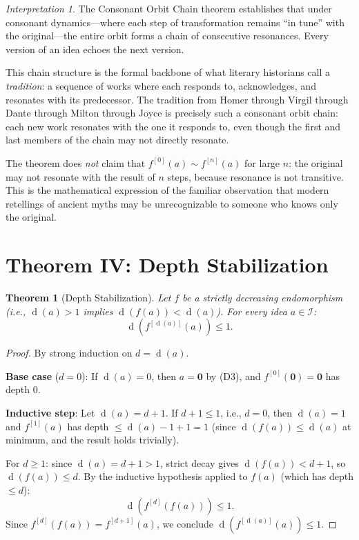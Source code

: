 \documentclass[11pt,openany]{book}
\theoremstyle{definition}
\theoremstyle{plain}
\newtheorem{theorem}[axiom]{Theorem}
\theoremstyle{remark}
\newtheorem{interpretation}[axiom]{Interpretation}
\newcommand{\IS}{\mathcal{I}}               %
\newcommand{\void}{\mathbf{0}}              %
\newcommand{\res}{\sim}                      %
\newcommand{\depth}{\operatorname{d}}       %
\begin{document}
\begin{interpretation}
The Consonant Orbit Chain theorem establishes that under consonant dynamics---where each step of transformation remains ``in tune'' with the original---the entire orbit forms a chain of consecutive resonances. Every version of an idea echoes the next version.

This chain structure is the formal backbone of what literary historians call a \emph{tradition}: a sequence of works where each responds to, acknowledges, and resonates with its predecessor. The tradition from Homer through Virgil through Dante through Milton through Joyce is precisely such a consonant orbit chain: each new work resonates with the one it responds to, even though the first and last members of the chain may not directly resonate.

The theorem does \emph{not} claim that $f^{[0]}(a) \res f^{[n]}(a)$ for large $n$: the original may not resonate with the result of $n$ steps, because resonance is not transitive. This is the mathematical expression of the familiar observation that modern retellings of ancient myths may be unrecognizable to someone who knows only the original.
\end{interpretation}

\section{Theorem IV: Depth Stabilization}

\begin{theorem}[Depth Stabilization]
\label{thm:key-depth-stab}
Let $f$ be a strictly decreasing endomorphism (i.e., $\depth(a) > 1$ implies $\depth(f(a)) < \depth(a)$). For every idea $a \in \IS$:
\[
\depth(f^{[\depth(a)]}(a)) \leq 1.
\]
\end{theorem}

\begin{proof}
By strong induction on $d = \depth(a)$.

\textbf{Base case} ($d = 0$): If $\depth(a) = 0$, then $a = \void$ by (D3), and $f^{[0]}(\void) = \void$ has depth 0.

\textbf{Inductive step}: Let $\depth(a) = d + 1$. If $d + 1 \leq 1$, i.e., $d = 0$, then $\depth(a) = 1$ and $f^{[1]}(a)$ has depth $\leq \depth(a) - 1 + 1 = 1$ (since $\depth(f(a)) \leq \depth(a)$ at minimum, and the result holds trivially). 

For $d \geq 1$: since $\depth(a) = d + 1 > 1$, strict decay gives $\depth(f(a)) < d + 1$, so $\depth(f(a)) \leq d$. By the inductive hypothesis applied to $f(a)$ (which has depth $\leq d$):
\[
\depth(f^{[d]}(f(a))) \leq 1.
\]
Since $f^{[d]}(f(a)) = f^{[d+1]}(a)$, we conclude $\depth(f^{[\depth(a)]}(a)) \leq 1$.
\end{proof}
\end{document}
